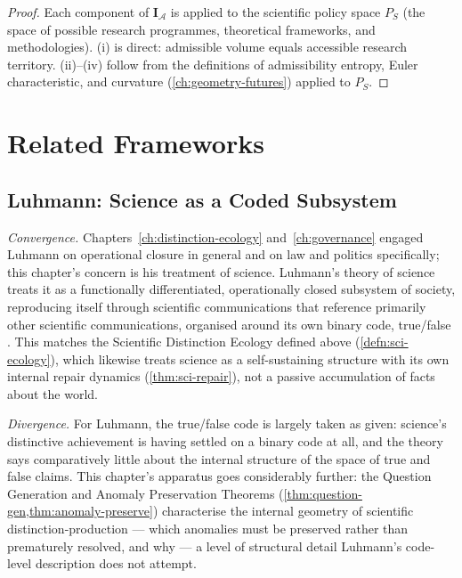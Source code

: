 \documentclass[12pt,twoside,openright]{book}
\newcommand{\adm}{\mathcal{A}}
\begin{document}
\begin{proof}
  Each component of $\mathbf{I}_\adm$ is applied to
  the scientific policy space $P_S$ (the space of
  possible research programmes, theoretical frameworks,
  and methodologies).
  (i) is direct: admissible volume equals accessible
  research territory.
  (ii)--(iv) follow from the definitions of
  admissibility entropy, Euler characteristic, and
  curvature (\cref{ch:geometry-futures}) applied to $P_S$.
\end{proof}

\section{Related Frameworks}
\label{sec:ch29-related-frameworks}

\subsection*{Luhmann: Science as a Coded Subsystem}

\emph{Convergence.} Chapters~\ref{ch:distinction-ecology}
and~\ref{ch:governance} engaged Luhmann on operational closure in
general and on law and politics specifically; this chapter's
concern is his treatment of science. Luhmann's theory of science
treats it as a functionally differentiated, operationally closed
subsystem of society, reproducing itself through scientific
communications that reference primarily other scientific
communications, organised around its own binary code, true/false
\parencite{luhmann1990}. This matches the Scientific Distinction
Ecology defined above (\cref{defn:sci-ecology}), which likewise
treats science as a self-sustaining structure with its own
internal repair dynamics (\cref{thm:sci-repair}), not a passive
accumulation of facts about the world.

\emph{Divergence.} For Luhmann, the true/false code is largely
taken as given: science's distinctive achievement is having
settled on a binary code at all, and the theory says comparatively
little about the internal structure of the space of true and
false claims. This chapter's apparatus goes considerably further:
the Question Generation and Anomaly Preservation Theorems
(\cref{thm:question-gen,thm:anomaly-preserve}) characterise the
internal geometry of scientific distinction-production --- which
anomalies must be preserved rather than prematurely resolved, and
why --- a level of structural detail Luhmann's code-level
description does not attempt.
\end{document}
